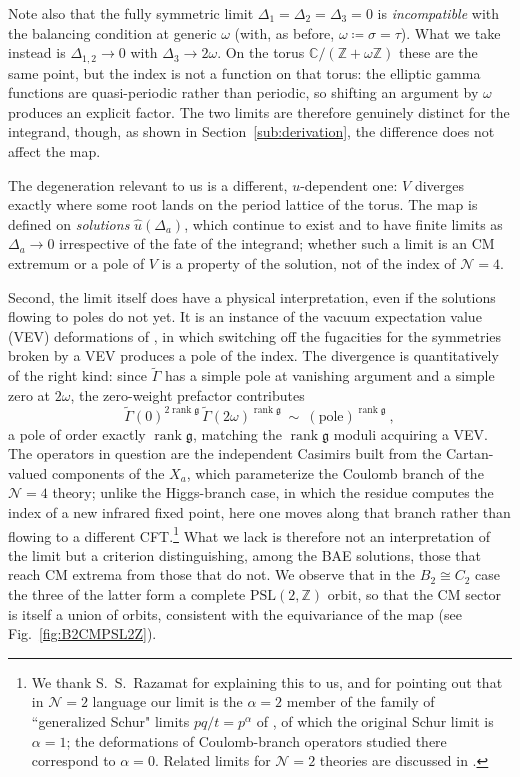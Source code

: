 \documentclass[aps, prx, nofootinbib, twocolumn,amsfonts,amsmath,amssymb,mathtools,superscriptaddress,preprintnumbers,floatfix,reprint]{revtex4-2}
\newcommand{\alg}{\mathfrak{g}}
\DeclareMathOperator{\rank}{rank}
\begin{document}
Note also that the fully symmetric limit $\Delta_1=\Delta_2=\Delta_3=0$ is
\emph{incompatible} with the balancing condition at generic $\omega$ (with, as before, $\omega\coloneqq\sigma=\tau$). What we
take instead is $\Delta_{1,2}\to0$ with $\Delta_3\to2\omega$. On the torus
$\mathbb{C}/(\mathbb{Z}+\omega\mathbb{Z})$ these are the same point, but the
index is not a function on that torus: the elliptic gamma functions are
quasi-periodic rather than periodic, so shifting an argument by $\omega$
produces an explicit factor. The two limits are therefore genuinely distinct
for the integrand, though, as shown in Section~\ref{sub:derivation}, the
difference does not affect the map.

The degeneration relevant to us is a different, $u$-dependent one: $V$ diverges
exactly where some root lands on the period lattice of the torus. The map is defined on
\emph{solutions} $\hat u(\Delta_a)$, which continue to exist and to have finite
limits as $\Delta_a\to0$ irrespective of the fate of the integrand; whether such
a limit is an CM extremum or a pole of $V$ is a property of the solution, not of
the index of $\mathcal{N}=4$.

Second, the limit itself does have a physical interpretation, even if the
solutions flowing to poles do not yet. It is an instance of the vacuum
expectation value (VEV) deformations of \cite[Sec.~7.3]{Rastelli:2016tbz}, in
which switching off the fugacities for the symmetries broken by a VEV produces a
pole of the index. The divergence is quantitatively of the right kind: since
$\tilde\Gamma$ has a simple pole at vanishing argument and a simple zero at
$2\omega$, the zero-weight prefactor contributes
\begin{equation}\label{eq:polecount}
    \tilde\Gamma(0)^{2\rank\alg}\,\tilde\Gamma(2\omega)^{\rank\alg}
    \ \sim\ (\text{pole})^{\rank\alg}\ ,
\end{equation}
a pole of order exactly $\rank\alg$, matching the $\rank\alg$ moduli acquiring a
VEV. The operators in question are the independent Casimirs built from the
Cartan-valued components of the $X_a$, which parameterize the Coulomb branch of
the $\mathcal{N}=4$ theory; unlike the Higgs-branch case, in which the residue
computes the index of a new infrared fixed point, here one moves along that
branch rather than flowing to a different CFT.\footnote{We thank
S.~S.~Razamat for explaining this to us, and for pointing out that in
$\mathcal{N}=2$ language our limit is the $\alpha=2$ member of the family of ``generalized Schur" limits
$pq/t=p^\alpha$ of \cite{Zeev:2026alb}, of which the original Schur limit is
$\alpha=1$; the deformations of Coulomb-branch operators studied there
correspond to $\alpha=0$. Related limits for $\mathcal{N}=2$ theories are
discussed in \cite{Deb:2025ypl,Cecotti:2015lab}.} What we lack is therefore not
an interpretation of the limit but a criterion distinguishing, among the BAE
solutions, those that reach CM extrema from those that do not. We observe that
in the $B_2\cong C_2$ case the three of the latter form a complete
$\mathrm{PSL}(2,\mathbb{Z})$ orbit, so that the CM sector is itself a union of
orbits, consistent with the equivariance of the map
(see Fig.~\ref{fig:B2CMPSL2Z}).
\end{document}
